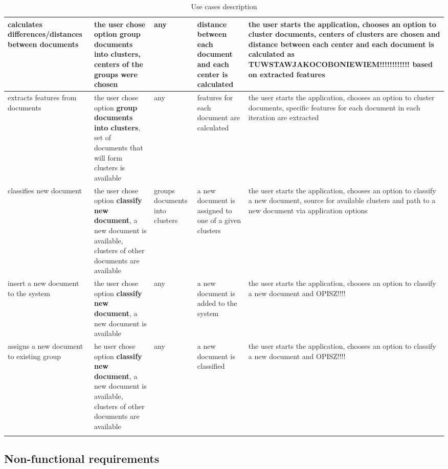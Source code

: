 \begin{longtable}{| p{2.5cm} | p{2.3cm} | p{2.2cm} | p{2cm} | p{2.5cm} |}
calculates  differences/distances between documents          &the user chose option \textbf{group documents into clusters}, centers of the groups were chosen    &any   &distance between each document and each center is calculated &the user starts the application, chooses an option to cluster documents, centers of clusters are chosen and distance between each center and each document is calculated as TUWSTAWJAKOCOBONIEWIEM!!!!!!!!!!!! based on extracted features \\\hline

extracts features from documents &the user chose option \textbf{group documents into clusters}, set of documents that will form clusters is available  &any   &features for each document are calculated   &the user starts the application, chooses an option to cluster documents,  specific features for each document in each iteration are extracted\\\hline

classifies new document     &the user chose option \textbf{classify new document}, a new document is available, clusters of other documents are available &groups documents into clusters &a new document is assigned to one of a given clusters &the user starts the application, chooses an option to classify a new document, source for available clusters and path to a new document via application options\\\hline

insert a new document to the system   &the user chose option \textbf{classify new document}, a new document is available     &any  &a new document is added to the system   &the user starts the application, chooses an option to classify a new document and OPISZ!!!!\\\hline

assigns a new document to existing group  &he user chose option \textbf{classify new document}, a new document is available, clusters of other documents are available      &any &a new document is classified    &the user starts the application, chooses an option to classify a new document and OPISZ!!!!\\\hline
\caption{Use cases description}
\label{tab:tableusecase}\\                                                                                
\end{longtable}

    
\subsection{Non-functional requirements}
